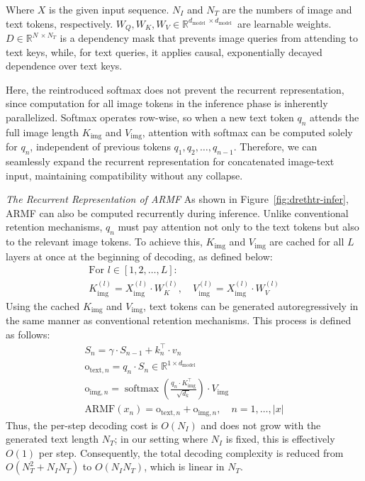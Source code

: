 \documentclass[times, review, 10pt]{elsarticle}
\begin{document}
Where \(X\) is the given input sequence. \(N_I\) and \(N_T\) are the numbers of image and text tokens, respectively. \(W_Q, W_K, W_V \in \mathbb{R}^{d_{\text {model }} \times d_{\text {model }}}\) are learnable weights. \(D \in \mathbb{R}^{N\ \times N_T}\) is a dependency mask that prevents image queries from attending to text keys, while, for text queries, it applies causal, exponentially decayed dependence over text keys.

Here, the reintroduced softmax does not prevent the recurrent representation, since computation for all image tokens in the inference phase is inherently parallelized. Softmax operates row-wise, so when a new text token \( q_n \) attends the full image length \( K_{\text{img}} \) and \( V_{\text{img}} \), attention with softmax can be computed solely for \( q_n \), independent of previous tokens $q_1, q_2, \dots, q_{n-1}$. Therefore, we can seamlessly expand the recurrent representation for concatenated image-text input, maintaining compatibility without any collapse.

\par\smallskip
\noindent\textit{The Recurrent Representation of ARMF} As shown in Figure~\ref{fig:drethtr-infer}, ARMF can also be computed recurrently during inference. Unlike conventional retention mechanisms, \(q_n\) must pay attention not only to the text tokens but also to the relevant image tokens. To achieve this, \(K_{\text{img}}\) and \(V_{\text{img}}\) are cached for all $L$ layers at once at the beginning of decoding, as defined below:
\begin{equation}
\begin{gathered}
\text{For } l \in [1,2, \dots, L]: \\
K_{\mathrm{img}}^{(l)} = X_{\mathrm{img}}^{(l)} \cdot W_K^{(l)}, \quad 
V_{\mathrm{img}}^{(l)} = X_{\mathrm{img}}^{(l)} \cdot W_V^{(l)}
\end{gathered}
\end{equation}
Using the cached \(K_{\text{img}}\) and \(V_{\text{img}}\), text tokens can be generated autoregressively in the same manner as conventional retention mechanisms. This process is defined as follows:
\begin{equation}
\begin{gathered}
{S}_n = \gamma \cdot {S}_{n-1} + {k}_n^\top \cdot {v}_n \\
\text{o}_{\text{text}, n} = {q}_n \cdot {S}_n \in \mathbb{R}^{1 \times d_{\text{model}}} \\
\text{o}_{\text{img}, n} = \operatorname{softmax}\left(\frac{{q}_n \cdot {K}_{\text{img}}^\top}{\sqrt{d_k}}\right) \cdot {V}_{\mathrm{img}} \\
\text{ARMF}(x_n) = \text{o}_{\text{text}, n} + \text{o}_{\text{img}, n}, \quad n=1, \dots, |x|
\end{gathered}
\end{equation}
Thus, the per-step decoding cost is $O(N_I)$ and does not grow with the generated text length $N_T$; in our setting where $N_I$ is fixed, this is effectively $O(1)$ per step. Consequently, the total decoding complexity is reduced from $O(N_T^2 + N_I N_T)$ to $O(N_I N_T)$, which is linear in $N_T$.
\end{document}
